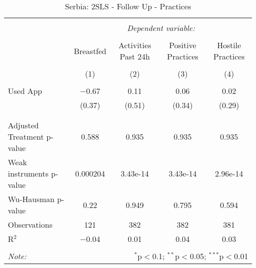 
\begin{table}[!htbp] \centering 
  \caption{Serbia: 2SLS - Follow Up - Practices} 
  \label{tbl:Serbia: 2SLS - Follow Up - Practices} 
\begin{tabular}{@{\extracolsep{5pt}}lcccc} 
\\[-1.8ex]\hline 
\hline \\[-1.8ex] 
 & \multicolumn{4}{c}{\textit{Dependent variable:}} \\ 
\cline{2-5} 
\\[-1.8ex] & Breastfed & Activities Past 24h & Positive Practices & Hostile Practices \\ 
\\[-1.8ex] & (1) & (2) & (3) & (4)\\ 
\hline \\[-1.8ex] 
 Used App & $-$0.67 & 0.11 & 0.06 & 0.02 \\ 
  & (0.37) & (0.51) & (0.34) & (0.29) \\ 
  & & & & \\ 
\hline \\[-1.8ex] 
Adjusted Treatment p-value & 0.588 & 0.935 & 0.935 & 0.935 \\ 
Weak instruments p-value & 0.000204 & 3.43e-14 & 3.43e-14 & 2.96e-14 \\ 
Wu-Hausman p-value & 0.22 & 0.949 & 0.795 & 0.594 \\ 
Observations & 121 & 382 & 382 & 381 \\ 
R$^{2}$ & $-$0.04 & 0.01 & 0.04 & 0.03 \\ 
\hline 
\hline \\[-1.8ex] 
\textit{Note:}  & \multicolumn{4}{r}{$^{*}$p$<$0.1; $^{**}$p$<$0.05; $^{***}$p$<$0.01} \\ 
\end{tabular} 
\end{table} 
